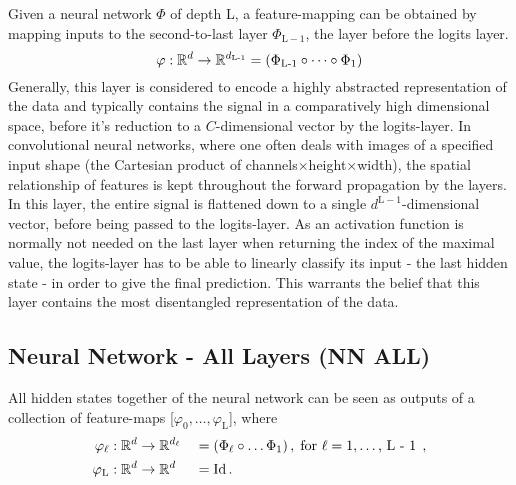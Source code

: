Given a neural network $\Phi$ of depth L,
a feature-mapping can be obtained by mapping inputs to the second-to-last layer $\Phi_{\text{L}-1}$, 
the layer before the logits layer.
\[
    \varphi : \mathbb{R}^d \to \mathbb{R}^{d_\textnormal{L-1}} = (\Phi_\textnormal{L-1} \circ \dots \circ \Phi_1)
\]
Generally, this layer is considered to encode a highly abstracted representation of the data
and typically contains the signal in a comparatively high dimensional space, before it's
reduction to a $C$-dimensional vector by the logits-layer.
In convolutional neural networks, where one often deals with images
of a specified input shape (the Cartesian product of channels$\times$height$\times$width), 
the spatial relationship of features is kept throughout the forward propagation by the layers.
In this layer, the entire signal is flattened down to a single $d^{\text{L}-1}$-dimensional vector, 
before being passed to the logits-layer.
As an activation function is normally not needed on the last layer when returning the index of the maximal value, 
the logits-layer has to be able to linearly classify its input - the last hidden state - in order to 
give the final prediction.
This warrants the belief that this layer contains the most disentangled representation of the data.


\subsection{Neural Network - All Layers (NN ALL)}

All hidden states together of the neural network can be seen as outputs of a collection of feature-maps [$\varphi_0, \dots, \varphi_\text{L}$], where
\begin{alignat*}{2}
    \varphi_\ell &: \mathbb{R}^d \to \mathbb{R}^{d_\ell} &&= (\Phi_\ell \circ \dots \Phi_1)
    \,, \; \text{for $\ell = 1, \dots$, L - 1} \;  \,, \\
    \varphi_\textnormal{L} &: \mathbb{R}^d \to \mathbb{R}^d &&= \textnormal{Id} \,.
\end{alignat*}





